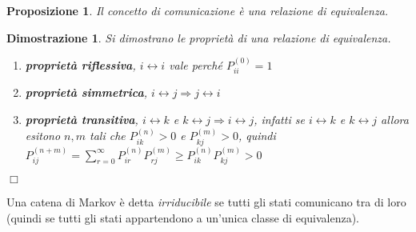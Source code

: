 \documentclass{article}
\newtheorem{proposizione}{Proposizione}[section]
\newtheorem*{dimostrazione*}{Dimostrazione}
\newcommand*{\QED}{\hfill\ensuremath{\Box}}
\begin{document}
\begin{proposizione}
Il concetto di \textit{comunicazione} è una relazione di equivalenza.
\end{proposizione}
\begin{dimostrazione*}
Si dimostrano le proprietà di una relazione di equivalenza.
\begin{enumerate}
    \item \textbf{proprietà riflessiva}, $i \leftrightarrow i$ vale perché $P_{ii}^{(0)} = 1$
    \item \textbf{proprietà simmetrica}, $i \leftrightarrow j \Rightarrow j \leftrightarrow i$
    \item \textbf{proprietà transitiva}, $i \leftrightarrow k$ e $k \leftrightarrow j \Rightarrow i \leftrightarrow j$, infatti se $i \leftrightarrow k$ e $k \leftrightarrow j$ allora esitono $n,m$ tali che $P_{ik}^{(n)} > 0$ e $P_{kj}^{(m)} > 0$, quindi $P_{ij}^{(n+m)} = \sum_{r=0}^{\infty} P_{ir}^{(n)}P_{rj}^{(m)} \ge P_{ik}^{(n)}P_{kj}^{(m)} > 0$
\end{enumerate}
\QED
\end{dimostrazione*}
Una catena di Markov è detta \textit{irriducibile} se tutti gli stati comunicano tra di loro (quindi se tutti gli stati appartendono a un'unica classe di equivalenza).
\end{document}
